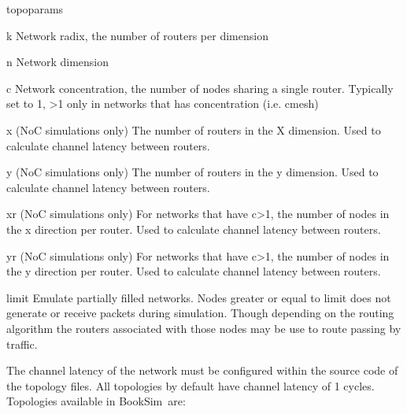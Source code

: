 \documentclass[11pt]{article}
\newcommand{\simname}{BookSim~}
\begin{document}
\begin{opt_list}{topoparams}

\item[k] Network radix, the number of routers per dimension
\item[n] Network dimension
\item[c] Network concentration, the number of nodes sharing a single router. Typically set to 1, >1 only in networks that has concentration (i.e. cmesh)
\item[x] (NoC simulations only) The number of routers in the X dimension. Used to calculate channel latency between routers. 
\item[y] (NoC simulations only) The number of routers in the y dimension. Used to calculate channel latency between routers. 
\item[xr] (NoC simulations only) For networks that have c>1, the number of nodes in the x direction per router. Used to calculate channel latency between routers. 
\item[yr] (NoC simulations only) For networks that have c>1, the number of nodes in the y direction per router. Used to calculate channel latency between routers. 
\item[limit] Emulate partially filled networks. Nodes greater or equal to limit does not generate or receive packets during simulation. Though depending on the routing algorithm the routers associated with those nodes may be use to route passing by traffic. 

\end{opt_list}


The channel latency of the network must be configured within the source code of the topology files. All topologies by default have channel latency of 1 cycles. Topologies available in \simname are:
\end{document}
